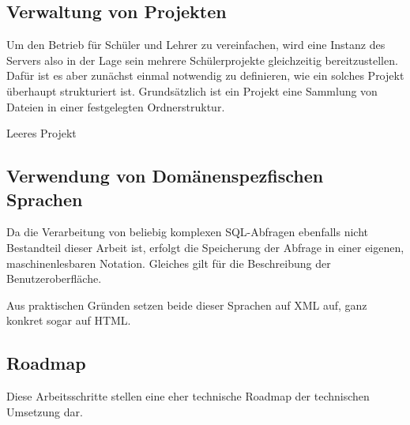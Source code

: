 \documentclass[paper=a4,fontsize=11pt,parskip=half]{scrartcl}
\begin{document}
\subsection{Verwaltung von Projekten}

Um den Betrieb für Schüler und Lehrer zu vereinfachen, wird eine Instanz des Servers also in der Lage sein mehrere Schülerprojekte gleichzeitig bereitzustellen. Dafür ist es aber zunächst einmal notwendig zu definieren, wie ein solches Projekt überhaupt strukturiert ist. Grundsätzlich ist ein Projekt eine Sammlung von Dateien in einer festgelegten Ordnerstruktur.

\begin{dirstruct}
  \caption{Leeres Projekt}
\end{dirstruct}

\subsection{Verwendung von Domänenspezfischen Sprachen}

Da die Verarbeitung von beliebig komplexen SQL-Abfragen ebenfalls nicht Bestandteil dieser Arbeit ist, erfolgt die Speicherung der Abfrage in einer eigenen, maschinenlesbaren Notation. Gleiches gilt für die Beschreibung der Benutzeroberfläche.

Aus praktischen Gründen setzen beide dieser Sprachen auf XML auf, ganz konkret sogar auf HTML.

\subsection{Roadmap}

Diese Arbeitsschritte stellen eine eher technische Roadmap der technischen Umsetzung dar.
\end{document}
